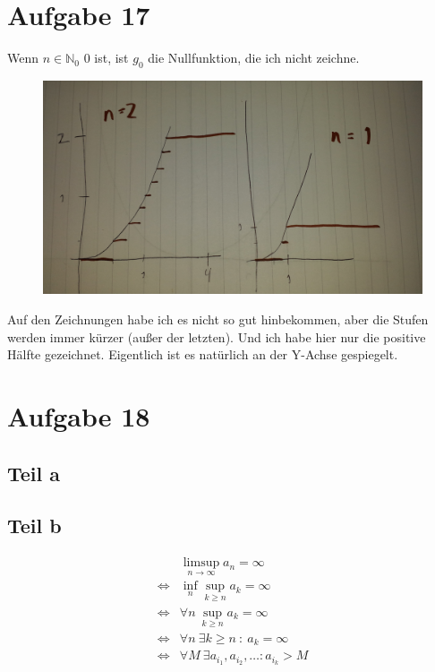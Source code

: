 \documentclass[10pt,a4paper]{article}
\begin{document}
\section{Aufgabe 17}
Wenn $n \in \mathbb{N}_{0}$ 0 ist, ist $g_{0}$ die Nullfunktion, die ich nicht zeichne.
\begin{figure}[H]
  \includegraphics[width=400pt]{5_1}
\end{figure}
Auf den Zeichnungen habe ich es nicht so gut hinbekommen, aber die Stufen werden immer kürzer (außer der letzten).
Und ich habe hier nur die positive Hälfte gezeichnet.
Eigentlich ist es natürlich an der Y-Achse gespiegelt.

\section{Aufgabe 18}

\subsection{Teil a}


\subsection{Teil b}
\begin{align*}
  & \limsup_{n \rightarrow \infty} a_{n} = \infty\\
  \Leftrightarrow & \inf_{n} \sup_{k \ge n} a_{k} = \infty\\
  \Leftrightarrow & \forall n\ \sup_{k \ge n} a_{k} = \infty\\
  \Leftrightarrow & \forall n\ \exists k \ge n\ :\ a_{k} = \infty\\
  \Leftrightarrow & \forall M\ \exists a_{i_{1}}, a_{i_{2}}, \dots : a_{i_{k}} > M\\
\end{align*}
\end{document}
